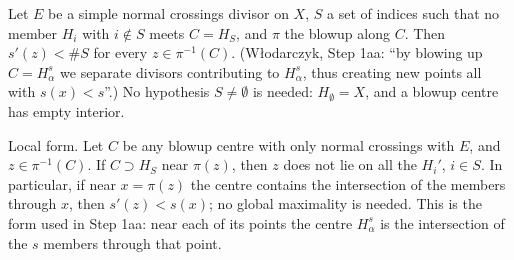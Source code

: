 \begin{theorem}
\label{bcalc:boundary-count-drop}
\upstreamleanok
Let \(E\) be a simple normal crossings divisor on \(X\), \(S\) a set of indices such that no member \(H_i\) with \(i\notin S\) meets
\(C=H_S\), and \(\pi\) the blowup along \(C\). Then \(s'(z)<\#S\) for every \(z\in\pi^{-1}(C)\). (Włodarczyk, Step 1aa: ``by blowing up
\(C=H^s_\alpha\) we separate divisors contributing to \(H^s_\alpha\), thus creating new points all with \(s(x)<s\)''.) No hypothesis
\(S\neq\emptyset\) is needed: \(H_\emptyset=X\), and a blowup centre has empty interior.

Local form. Let \(C\) be any blowup centre with only normal crossings with \(E\), and \(z\in\pi^{-1}(C)\). If \(C\supset H_S\) near
\(\pi(z)\), then \(z\) does not lie on all the \(H_i'\), \(i\in S\). In particular, if near \(x=\pi(z)\) the centre contains the intersection of
the members through \(x\), then \(s'(z)<s(x)\); no global maximality is needed. This is the form used in Step 1aa: near each of its points
the centre \(H^s_\alpha\) is the intersection of the \(s\) members through that point.
\end{theorem}
